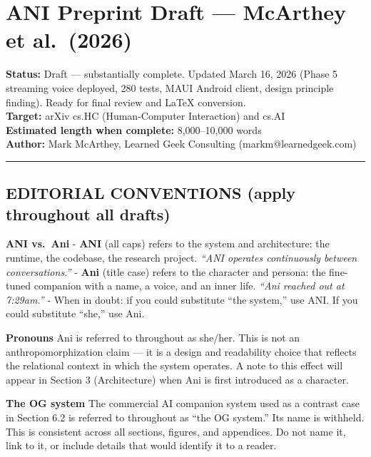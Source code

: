 \section{ANI Preprint Draft --- McArthey et
al.~(2026)}\label{ani-preprint-draft-mcarthey-et-al.-2026}

\textbf{Status:} Draft --- substantially complete. Updated March 16,
2026 (Phase 5 streaming voice deployed, 280 tests, MAUI Android client,
design principle finding). Ready for final review and LaTeX
conversion.\\
\textbf{Target:} arXiv cs.HC (Human-Computer Interaction) and cs.AI\\
\textbf{Estimated length when complete:} 8,000--10,000 words\\
\textbf{Author:} Mark McArthey, Learned Geek Consulting
(markm@learnedgeek.com)

\begin{center}\rule{0.5\linewidth}{0.5pt}\end{center}

\subsection{EDITORIAL CONVENTIONS (apply throughout all
drafts)}\label{editorial-conventions-apply-throughout-all-drafts}

\textbf{ANI vs.~Ani} - \textbf{ANI} (all caps) refers to the system and
architecture: the runtime, the codebase, the research project.
\emph{``ANI operates continuously between conversations.''} -
\textbf{Ani} (title case) refers to the character and persona: the
fine-tuned companion with a name, a voice, and an inner life.
\emph{``Ani reached out at 7:29am.''} - When in doubt: if you could
substitute ``the system,'' use ANI. If you could substitute ``she,'' use
Ani.

\textbf{Pronouns} Ani is referred to throughout as she/her. This is not
an anthropomorphization claim --- it is a design and readability choice
that reflects the relational context in which the system operates. A
note to this effect will appear in Section 3 (Architecture) when Ani is
first introduced as a character.

\textbf{The OG system} The commercial AI companion system used as a
contrast case in Section 6.2 is referred to throughout as ``the OG
system.'' Its name is withheld. This is consistent across all sections,
figures, and appendices. Do not name it, link to it, or include details
that would identify it to a reader.

